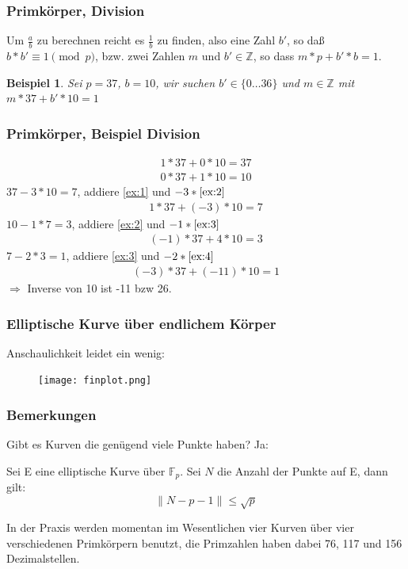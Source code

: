 \documentclass{beamer}
\newcommand{\F}{\mathbb{F}}
\newcommand{\Z}{\mathbb{Z}}
\newtheorem{beispiel}[theorem]{Beispiel}
\begin{document}
\begin{frame}
  \frametitle{Primkörper, Division}
  Um $\frac{a}{b}$ zu berechnen reicht es $\frac 1 b$ zu finden, also eine Zahl
  $b'$, so daß $b * b' \equiv 1 \pmod p$, bzw. zwei Zahlen $m$ und
  $b' \in \Z$, so dass $m * p + b' * b = 1$.
  \begin{beispiel}
    Sei $p = 37$, $b = 10$, wir suchen $b' \in \{0 \ldots 36\}$ und
    $m \in \Z$ mit $m * 37 + b' * 10 = 1$
  \end{beispiel}
\end{frame}

\begin{frame}
  \frametitle{Primkörper, Beispiel Division}
  \vspace*{-1cm}
  \begin{eqnarray}
    1 * 37 + 0 * 10 = 37  \label{ex:1} \\
    0 * 37 + 1 * 10 = 10  \label{ex:2}
  \end{eqnarray}
  $37 - 3 * 10 = 7$, addiere \eqref{ex:1} und $-3 * \eqref{ex:2}$
  \begin{eqnarray}
    1 *37 + (-3) * 10 = 7 \label{ex:3}
  \end{eqnarray}
  $10 - 1 * 7 = 3$, addiere \eqref{ex:2} und $-1 * \eqref{ex:3}$
  \begin{eqnarray}
    (-1) * 37 + 4 * 10 = 3 \label{ex:4}
  \end{eqnarray}
  $7 - 2*3 = 1$, addiere \eqref{ex:3} und $-2 * \eqref{ex:4}$
  \begin{eqnarray}
    (-3) * 37 + (-11) * 10 = 1
  \end{eqnarray}
  $\Rightarrow$ Inverse von 10 ist -11 bzw 26.
\end{frame}

\begin{frame}
  \frametitle{Elliptische Kurve über endlichem Körper}
  Anschaulichkeit leidet ein wenig:
  \begin{figure}
    \texttt{[image: finplot.png]}
  \end{figure}
\end{frame}
\begin{frame}
  \frametitle{Bemerkungen}
  Gibt es Kurven die genügend viele Punkte haben? Ja:
  \begin{theorem}
    Sei E eine elliptische Kurve über $\F_p$. Sei $N$ die Anzahl der Punkte
    auf E, dann gilt:
    \begin{equation}
      \| N - p - 1 \| \le \sqrt{p}
    \end{equation}
  \end{theorem}
  In der Praxis werden momentan im Wesentlichen vier Kurven über vier
  verschiedenen Primkörpern benutzt, die Primzahlen haben dabei 76, 117 und
  156 Dezimalstellen.
\end{frame}
\end{document}
